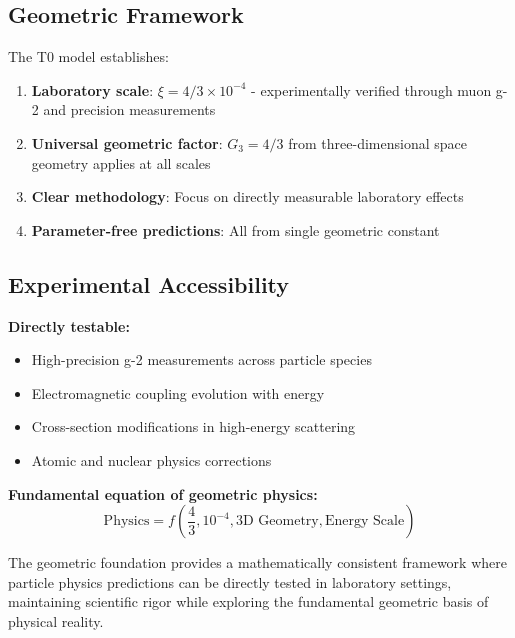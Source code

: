 \documentclass[12pt,a4paper]{report}
\begin{document}
\subsection{Geometric Framework}
\label{subsec:geometric_framework}

The T0 model establishes:

\begin{enumerate}
	\item \textbf{Laboratory scale}: $\xi = 4/3 \times 10^{-4}$ - experimentally verified through muon g-2 and precision measurements
	
	\item \textbf{Universal geometric factor}: $G_3 = 4/3$ from three-dimensional space geometry applies at all scales
	
	\item \textbf{Clear methodology}: Focus on directly measurable laboratory effects
	
	\item \textbf{Parameter-free predictions}: All from single geometric constant
\end{enumerate}

\subsection{Experimental Accessibility}
\label{subsec:experimental_accessibility}

\textbf{Directly testable:}
\begin{itemize}
	\item High-precision g-2 measurements across particle species
	\item Electromagnetic coupling evolution with energy
	\item Cross-section modifications in high-energy scattering
	\item Atomic and nuclear physics corrections
\end{itemize}

\textbf{Fundamental equation of geometric physics:}
\begin{equation}
	\boxed{\text{Physics} = f\left(\frac{4}{3}, 10^{-4}, \text{3D Geometry}, \text{Energy Scale}\right)}
\end{equation}

The geometric foundation provides a mathematically consistent framework where particle physics predictions can be directly tested in laboratory settings, maintaining scientific rigor while exploring the fundamental geometric basis of physical reality.
\end{document}
